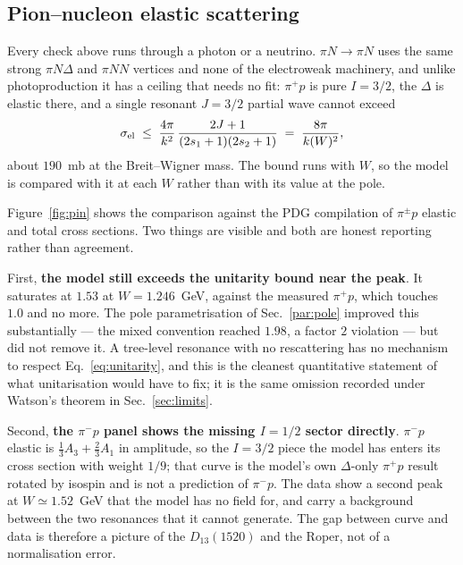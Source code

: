 \documentclass[11pt,a4paper]{article}
\begin{document}
\subsection{Pion--nucleon elastic scattering}
\label{sec:pin}

Every check above runs through a photon or a neutrino. $\pi N\to\pi N$ uses the
same strong $\pi N\Delta$ and $\pi NN$ vertices and none of the electroweak
machinery, and unlike photoproduction it has a ceiling that needs no fit:
$\pi^+p$ is pure $I=3/2$, the $\Delta$ is elastic there, and a single resonant
$J=3/2$ partial wave cannot exceed
\begin{equation}
  \sigma_{\rm el} \;\le\; \frac{4\pi}{k^2}\,
  \frac{2J+1}{(2s_1+1)(2s_2+1)} \;=\; \frac{8\pi}{k(W)^2},
  \label{eq:unitarity}
\end{equation}
about $190$~mb at the Breit--Wigner mass. The bound runs with $W$, so the model
is compared with it at each $W$ rather than with its value at the pole.

Figure~\ref{fig:pin} shows the comparison against the PDG compilation of
$\pi^\pm p$ elastic and total cross sections. Two things are visible and both
are honest reporting rather than agreement.

First, \textbf{the model still exceeds the unitarity bound near the peak}. It
saturates at $1.53$ at $W = 1.246$~GeV, against the measured $\pi^+p$, which
touches $1.0$ and no more. The pole parametrisation of Sec.~\ref{par:pole}
improved this substantially --- the mixed convention reached $1.98$, a factor
$2$ violation --- but did not remove it. A tree-level resonance with no
rescattering has no mechanism to respect Eq.~\eqref{eq:unitarity}, and this is
the cleanest quantitative statement of what unitarisation would have to fix; it
is the same omission recorded under Watson's theorem in Sec.~\ref{sec:limits}.

Second, \textbf{the $\pi^-p$ panel shows the missing $I=1/2$ sector directly}.
$\pi^-p$ elastic is $\tfrac13 A_3 + \tfrac23 A_1$ in amplitude, so the
$I=3/2$ piece the model has enters its cross section with weight $1/9$; that
curve is the model's own $\Delta$-only $\pi^+p$ result rotated by isospin and is
not a prediction of $\pi^-p$. The data show a second peak at $W\simeq1.52$~GeV
that the model has no field for, and carry a background between the two
resonances that it cannot generate. The gap between curve and data is therefore
a picture of the $D_{13}(1520)$ and the Roper, not of a normalisation error.
\end{document}
